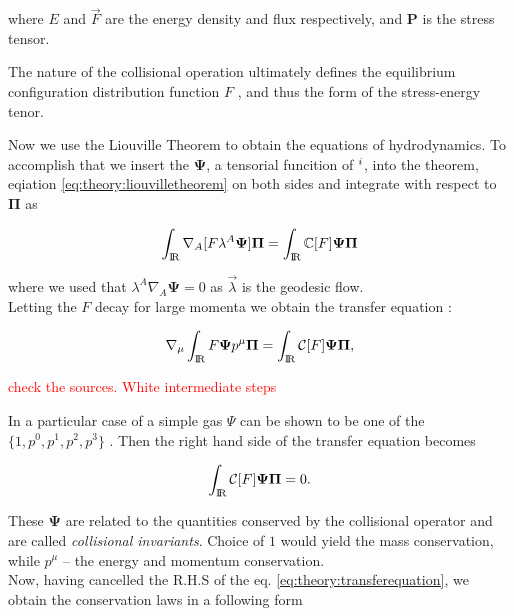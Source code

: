\documentclass[11pt,a4paper,headinclude=true,DIV=14,BCOR=8mm,chapterprefix,listof=totoc,twoside,openright,abstracton]{scrbook}
\begin{document}
where $E$ and $\vec{F}$ are the energy density and flux respectively, and $\boldsymbol{P}$ is the stress tensor. 

The nature of the collisional operation ultimately defines the equilibrium configuration distribution function $F$ \cite{Cercignani:2002}, and thus the form of the stress-energy tenor. 

Now we use the Liouville Theorem to obtain the equations of hydrodynamics. 
To accomplish that we insert the $\boldsymbol{\Psi}$, a tensorial funcition of $\pagebreak^i$, into the theorem, eqiation \ref{eq:theory:liouvilletheorem} on both sides and integrate with respect to $\boldsymbol{\Pi}$ as

\begin{equation}
    \int_{\text{I\!R}}\nabla_{A}[F\lambda^A\boldsymbol{\Psi}]\boldsymbol{\Pi}=\int_{\text{I\!R}}\mathbb{C}[F]\boldsymbol{\Psi}\boldsymbol{\Pi}
\end{equation}

where we used that $\lambda^A\nabla_{A}\boldsymbol{\Psi}=0$ as $\vec{\lambda}$ is the geodesic flow. \\

Letting the $F$ decay for large momenta we obtain the transfer equation \cite{Israel:1963,Cercignani:2002}:

\begin{equation}
    \nabla_{\mu}\int_{\text{I\!R}} F\boldsymbol{\Psi}p^{\mu}\boldsymbol{\Pi} =\int_{\text{I\!R}} \mathcal{C}[F]\boldsymbol{\Psi}\boldsymbol{\Pi},
    \label{eq:theory:transferequation}
\end{equation}

\textcolor{red}{check the sources. White intermediate steps}

In a particular case of a simple gas $\Psi$ can be shown to be one of the $\{1,p^0,p^1,p^2,p^3\}$ \cite{Cercignani:2002}. Then the right hand side of the transfer equation becomes 

\begin{equation}
    \int_{\text{I\!R}} \mathcal{C}[F]\boldsymbol{\Psi}\boldsymbol{\Pi} = 0.
\end{equation}

These $\boldsymbol{\Psi}$ are related to the quantities conserved by the collisional operator and are called \textit{collisional invariants}. Choice of $1$ would yield the mass conservation, while $p^{\mu}$ -- the energy and momentum conservation. \\

Now, having cancelled the R.H.S of the eq. \ref{eq:theory:transferequation}, we obtain the conservation laws in a following form
\end{document}
